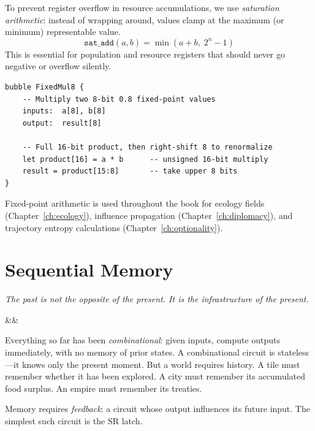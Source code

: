 \documentclass[11pt,a4paper,openany]{book}
\theoremstyle{plain}
\theoremstyle{definition}
\theoremstyle{remark}
\newenvironment{background}{%
  \begin{mdframed}[
    linecolor=sphereblue!40, backgroundcolor=sphereblue!5,
    linewidth=1pt, innertopmargin=8pt, innerbottommargin=8pt,
    innerleftmargin=10pt, innerrightmargin=10pt,
    skipabove=10pt, skipbelow=6pt
  ]%
  \setlength{\parindent}{0pt}%
  \noindent{\textcolor{sphereblue}{\textbf{Background}}}\par\smallskip\ignorespaces
}{\end{mdframed}}
\newenvironment{implementation}{%
  \begin{mdframed}[
    linecolor=sphereamber!80, backgroundcolor=sphereamber!5,
    linewidth=1pt, innertopmargin=8pt, innerbottommargin=8pt,
    innerleftmargin=10pt, innerrightmargin=10pt,
    skipabove=10pt, skipbelow=6pt
  ]%
  \setlength{\parindent}{0pt}%
  \noindent{\textcolor{sphereamber!80!black}{\textbf{Implementation}}}\par\smallskip\ignorespaces
}{\end{mdframed}}
\newenvironment{defbox}[1]{%
  \begin{tcolorbox}[
    title={\textbf{Definition:} #1},
    colback=defbg,
    colframe=sphereamber!80,
    fonttitle=\bfseries,
    coltitle=sphereamber!60!black,
    sharp corners,
    breakable,
    before upper={\normalfont\setlength{\parindent}{0pt}\tolerance=9999\hbadness=9999}
  ]
}{\end{tcolorbox}}
\newcommand{\Spbox}{\textsc{Spherepop}\xspace}
\newcommand{\Spbox}{\textbf{Spherepop}\xspace}
\newcommand{\chapterquote}[2]{%
  \par\vspace{0.8em}%
  \begin{flushright}%
    \begin{minipage}{0.65\textwidth}%
      {\itshape #1\par}%
      \ifx&#2&\else\vspace{0.3em}{\raggedleft\small--- #2\par}\fi%
    \end{minipage}%
  \end{flushright}%
  \vspace{0.8em}\par\noindent}
\begin{document}
\begin{defbox}{Saturation Arithmetic}
  To prevent register overflow in resource accumulations, we use
  \emph{saturation arithmetic}: instead of wrapping around, values clamp
  at the maximum (or minimum) representable value.
  \[
    \texttt{sat\_add}(a, b) = \min(a + b,\; 2^n - 1)
  \]
  This is essential for population and resource registers that should never
  go negative or overflow silently.
\end{defbox}

\begin{implementation}
\begin{lstlisting}[caption={Fixed-point multiply in \Spbox }]
bubble FixedMul8 {
    -- Multiply two 8-bit 0.8 fixed-point values
    inputs:  a[8], b[8]
    output:  result[8]

    -- Full 16-bit product, then right-shift 8 to renormalize
    let product[16] = a * b      -- unsigned 16-bit multiply
    result = product[15:8]       -- take upper 8 bits
}
\end{lstlisting}
\end{implementation}

Fixed-point arithmetic is used throughout the book for ecology fields
(Chapter~\ref{ch:ecology}), influence propagation (Chapter~\ref{ch:diplomacy}),
and trajectory entropy calculations (Chapter~\ref{ch:optionality}).


\chapter{Sequential Memory}
\label{ch:memory}

\chapterquote{The past is not the opposite of the present.
  It is the infrastructure of the present.
}{}

\begin{background}
  Everything so far has been \emph{combinational}: given inputs, compute
  outputs immediately, with no memory of prior states. A combinational
  circuit is stateless---it knows only the present moment. But a world
  requires history. A tile must remember whether it has been explored.
  A city must remember its accumulated food surplus. An empire must
  remember its treaties.

  Memory requires \emph{feedback}: a circuit whose output influences its
  future input. The simplest such circuit is the SR latch.
\end{background}
\end{document}
